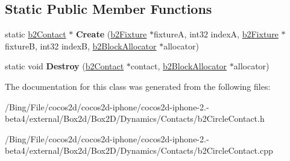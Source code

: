 \subsection*{Static Public Member Functions}
\begin{DoxyCompactItemize}
\item 
\hypertarget{classb2_circle_contact_ab0ea452487cb19217ae8480dbc22fd41}{static \hyperlink{classb2_contact}{b2\-Contact} $\ast$ {\bfseries Create} (\hyperlink{classb2_fixture}{b2\-Fixture} $\ast$fixture\-A, int32 index\-A, \hyperlink{classb2_fixture}{b2\-Fixture} $\ast$fixture\-B, int32 index\-B, \hyperlink{classb2_block_allocator}{b2\-Block\-Allocator} $\ast$allocator)}\label{classb2_circle_contact_ab0ea452487cb19217ae8480dbc22fd41}

\item 
\hypertarget{classb2_circle_contact_a4ca67c653a18d88180e49149f0df742a}{static void {\bfseries Destroy} (\hyperlink{classb2_contact}{b2\-Contact} $\ast$contact, \hyperlink{classb2_block_allocator}{b2\-Block\-Allocator} $\ast$allocator)}\label{classb2_circle_contact_a4ca67c653a18d88180e49149f0df742a}

\end{DoxyCompactItemize}


The documentation for this class was generated from the following files\-:\begin{DoxyCompactItemize}
\item 
/\-Bing/\-File/cocos2d/cocos2d-\/iphone/cocos2d-\/iphone-\/2.-\/beta4/external/\-Box2d/\-Box2\-D/\-Dynamics/\-Contacts/b2\-Circle\-Contact.\-h\item 
/\-Bing/\-File/cocos2d/cocos2d-\/iphone/cocos2d-\/iphone-\/2.-\/beta4/external/\-Box2d/\-Box2\-D/\-Dynamics/\-Contacts/b2\-Circle\-Contact.\-cpp\end{DoxyCompactItemize}

